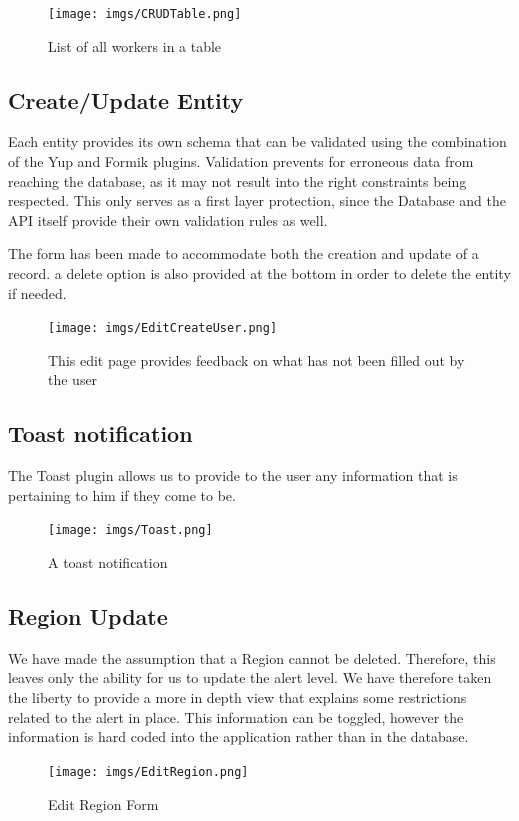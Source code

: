 \begin{figure}[H]
    \centering
    \texttt{[image: imgs/CRUDTable.png]}
    \caption{List of all workers in a table}
\end{figure}

\subsection{Create/Update Entity}

Each entity provides its own schema that can be validated using the combination of the Yup and Formik plugins. Validation prevents for erroneous data from reaching the database, as it may not result into the right constraints being respected. This only serves as a first layer protection, since the Database and the API itself provide their own validation rules as well.

The form has been made to accommodate both the creation and update of a record. a delete option is also provided at the bottom in order to delete the entity if needed.

\begin{figure}[H]
    \centering
    \texttt{[image: imgs/EditCreateUser.png]}
    \caption{This edit page provides feedback on what has not been filled out by the user}
\end{figure}

\subsection{Toast notification}

The Toast plugin allows us to provide to the user any information that is pertaining to him if they come to be.


\begin{figure}[H]
    \centering
    \texttt{[image: imgs/Toast.png]}
    \caption{A toast notification}
\end{figure}


\subsection{Region Update}

We have made the assumption that a Region cannot be deleted. Therefore, this leaves only the ability for us to update the alert level. We have therefore taken the liberty to provide a more in depth view that explains some restrictions related to the alert in place. This information can be toggled, however the information is hard coded into the application rather than in the database.

\begin{figure}[H]
    \centering
    \texttt{[image: imgs/EditRegion.png]}
    \caption{Edit Region Form}
\end{figure}
